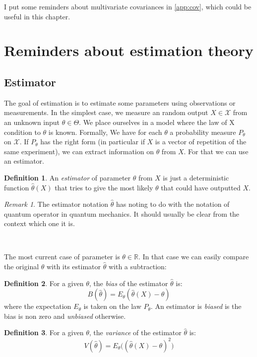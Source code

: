 \documentclass[10pt]{report}
\theoremstyle{plain}
\theoremstyle{definition}
\newtheorem{defn}{Definition}[chapter]
\theoremstyle{remark}
\newtheorem*{rem}{Remark}
\newcommand{\R}{\ensuremath{\mathbb{R}}}
\begin{document}
I put some reminders about multivariate covariances in
\cref{app:cov}, which could be useful in this chapter.

\section{Reminders about estimation theory}

\subsection{Estimator}

The goal of estimation is to estimate some parameters using observations or
measurements. In the simplest case, we measure an random output $X \in \mathcal{X}$ from an
unknown input $\theta \in \Theta$. We place ourselves in a model where the law
of X condition to $\theta$ is known. Formally, We have for each $\theta$ a
probability measure $P_\theta$ on $\mathcal{X}$. If $P_\theta$ has the right
form (in particular if $X$ is a vector of repetition of the same experiment), we
can extract information on $\theta$ from $X$. For that we can use an estimator.

\begin{defn}
  An \emph{estimator} of parameter $\theta$ from $X$ is just a deterministic
  function $\hat \theta(X)$ that tries to give the most likely $\theta$ that
  could have outputted $X$.
\end{defn}

\begin{rem}
  The estimator notation $\hat \theta$ has noting to do with the notation of
  quantum operator in quantum mechanics. It should usually be clear from the
  context which one it is.
\end{rem}

\

The most current case of parameter is $\theta \in \R$. In that case we can
easily compare the original $\theta$ with its estimator $\hat \theta$ with a
subtraction:

\begin{defn}
  For a given $\theta$, the \emph{bias} of the estimator $\hat \theta$ is:
  \[B(\hat{\theta}) = E_\theta(\hat{\theta}(X) - \theta)\]
  where the expectation $E_\theta$ is taken on the law $P_\theta$. An estimator
  is \emph{biased} is the bias is non zero and \emph{unbiased} otherwise.
\end{defn}

\begin{defn}
  For a given $\theta$, the \emph{variance} of the estimator $\hat \theta$ is:
  \[V(\hat{\theta}) = E_\theta\Big({(\hat{\theta}(X) - \theta)}^2\Big)\]
\end{defn}
\end{document}
